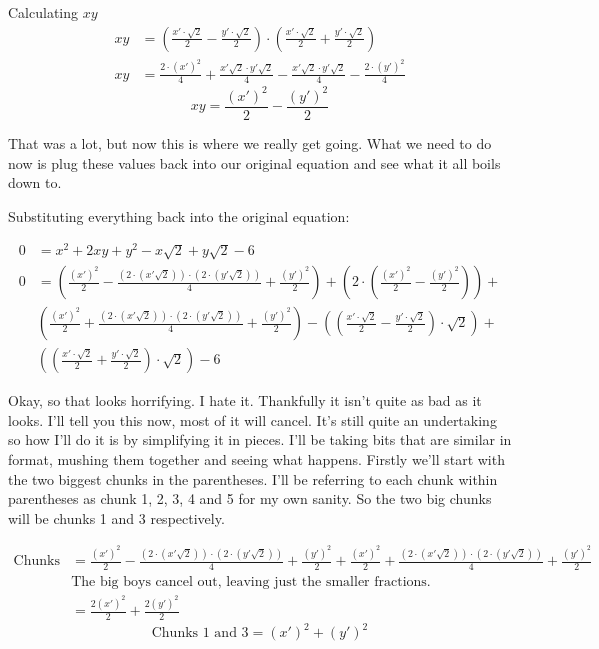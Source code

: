 \begin{solution}[Solution]
    Calculating $xy$
    \begin{align}
        xy &= \left( \frac{x' \cdot \sqrt{2}}{2} - \frac{y' \cdot \sqrt{2}}{2} \right) \cdot \left( \frac{x' \cdot \sqrt{2}}{2} + \frac{y' \cdot \sqrt{2}}{2} \right) \\
        xy &= \frac{2 \cdot (x')^2}{4} + \frac{x'\sqrt{2} \cdot y'\sqrt{2}}{4} - \frac{x'\sqrt{2} \cdot y'\sqrt{2}}{4} - \frac{2 \cdot (y')^2}{4}
    \end{align}
    \[\boxed{xy = \frac{(x')^2}{2} - \frac{(y')^2}{2}}\]
    
    That was a lot, but now this is where we really get going. What we need to do now is plug these values back into our original equation and see what it all boils down to. \pagebreak
    
    Substituting everything back into the original equation:
    
    \begin{align}
        0 &= x^2 + 2xy + y^2 - x\sqrt{2} + y\sqrt{2} - 6 \\
        0 &= \left( \frac{(x')^2}{2} - \frac{(2\cdot (x' \sqrt{2})) \cdot (2 \cdot (y' \sqrt{2}))}{4} + \frac{(y')^2}{2} \right) + \left( 2 \cdot \left( \frac{(x')^2}{2} - \frac{(y')^2}{2} \right) \right) + \\ 
        & \left( \frac{(x')^2}{2} + \frac{(2\cdot (x' \sqrt{2})) \cdot (2 \cdot (y' \sqrt{2}))}{4} + \frac{(y')^2}{2} \right) - \left( \left( \frac{x' \cdot \sqrt{2}}{2} - \frac{y' \cdot \sqrt{2}}{2} \right) \cdot \sqrt{2} \right) + \\
        & \left( \left( \frac{x' \cdot \sqrt{2}}{2} + \frac{y' \cdot \sqrt{2}}{2} \right) \cdot \sqrt{2} \right) - 6 
    \end{align}
    
    Okay, so that looks horrifying. I hate it. Thankfully it isn't quite as bad as it looks. I'll tell you this now, most of it will cancel. It's still quite an undertaking so how I'll do it is by simplifying it in pieces. I'll be taking bits that are similar in format, mushing them together and seeing what happens. Firstly we'll start with the two biggest chunks in the parentheses. I'll be referring to each chunk within parentheses as chunk 1, 2, 3, 4 and 5 for my own sanity. So the two big chunks will be chunks 1 and 3 respectively. 
    
    \begin{align}
        \text{Chunks 1 and 3} &= \frac{(x')^2}{2} - \frac{(2\cdot (x' \sqrt{2})) \cdot (2 \cdot (y' \sqrt{2}))}{4} + \frac{(y')^2}{2}  + \frac{(x')^2}{2} + \frac{(2\cdot (x' \sqrt{2})) \cdot (2 \cdot (y' \sqrt{2}))}{4} + \frac{(y')^2}{2} \\
        & \text{The big boys cancel out, leaving just the smaller fractions.} \\
        &= \frac{2(x')^2}{2} + \frac{2(y')^2}{2}
    \end{align}
    \[\boxed{\text{Chunks 1 and 3} = (x')^2 + (y')^2}\]
    

\end{solution}
